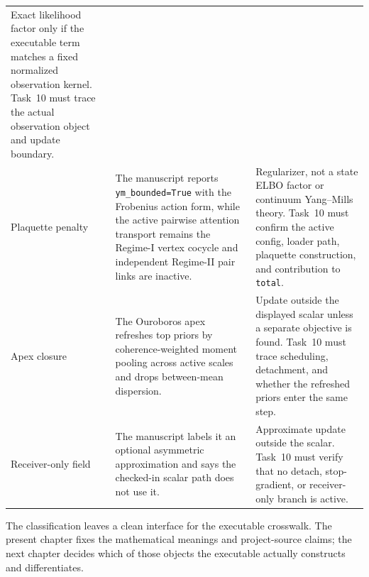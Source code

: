 \begin{longtable}{>{\raggedright\arraybackslash}p{}>{\raggedright\arraybackslash}p{}>{\raggedright\arraybackslash}p{}}
Exact likelihood factor only if the executable term matches a fixed normalized observation kernel. Task~10 must trace the actual observation object and update boundary.\\
Plaquette penalty &
The manuscript reports \texttt{ym\_bounded=True} with the Frobenius action form, while the active pairwise attention transport remains the Regime-I vertex cocycle and independent Regime-II pair links are inactive. &
Regularizer, not a state ELBO factor or continuum Yang--Mills theory. Task~10 must confirm the active config, loader path, plaquette construction, and contribution to \texttt{total}.\\
Apex closure &
The Ouroboros apex refreshes top priors by coherence-weighted moment pooling across active scales and drops between-mean dispersion. &
Update outside the displayed scalar unless a separate objective is found. Task~10 must trace scheduling, detachment, and whether the refreshed priors enter the same step.\\
Receiver-only field &
The manuscript labels it an optional asymmetric approximation and says the checked-in scalar path does not use it. &
Approximate update outside the scalar. Task~10 must verify that no detach, stop-gradient, or receiver-only branch is active.\\
\end{longtable}
\normalsize

The classification leaves a clean interface for the executable crosswalk. The present chapter fixes the mathematical meanings and project-source claims; the next chapter decides which of those objects the executable actually constructs and differentiates.
